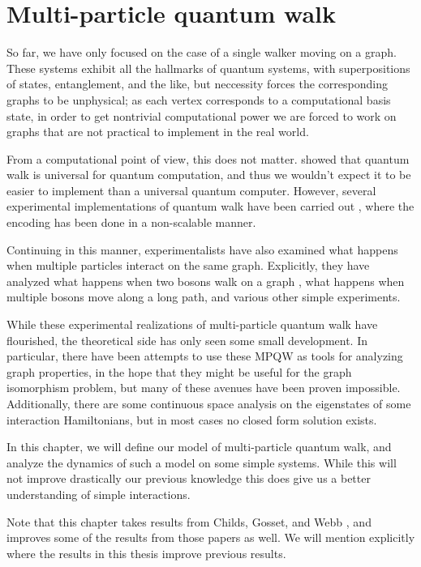 \documentclass[../thesis-main/thesis-main]{subfiles}
\begin{document}
 
\chapter{Multi-particle quantum walk}
\label{chap:MPQW}

So far, we have only focused on the case of a single walker moving on a graph.  These systems exhibit all the hallmarks of quantum systems, with superpositions of states, entanglement, and the like, but neccessity forces the corresponding graphs to be unphysical; as each vertex corresponds to a computational basis state, in order to get nontrivial computational power we are forced to work on graphs that are not practical to implement in the real world.

From a computational point of view, this does not matter.   showed that quantum walk is universal for quantum computation, and thus we wouldn't expect it to be easier to implement than a universal quantum computer.  However, several experimental implementations of quantum walk have been carried out \cite{DSBEFFMZ05, KFC09, PLP08}, where the encoding has been done in a non-scalable manner.  

Continuing in this manner, experimentalists have also examined what happens when multiple particles interact on the same graph.  Explicitly, they have analyzed what happens when two bosons walk on a graph \cite{BLMS09, PLM10,SSVMCRO12}, what happens when multiple bosons move along a long path, and various other simple experiments.

While these experimental realizations of multi-particle quantum walk have flourished, the theoretical side has only seen some small development.  In particular, there have been attempts to use these MPQW as tools for analyzing graph properties, in the hope that they might be useful for the graph isomorphism problem, but many of these avenues have been proven impossible.  Additionally, there are some continuous space analysis on the eigenstates of some interaction Hamiltonians, but in most cases no closed form solution exists.

In this chapter, we will define our model of multi-particle quantum walk, and analyze the dynamics of such a model on some simple systems.  While this will not improve drastically our previous knowledge this does give us a better understanding of simple interactions.

Note that this chapter takes results from Childs, Gosset, and Webb \cite{MPQW,BHQMA}, and improves some of the results from those papers as well.  We will mention explicitly where the results in this thesis improve previous results.
\end{document}
